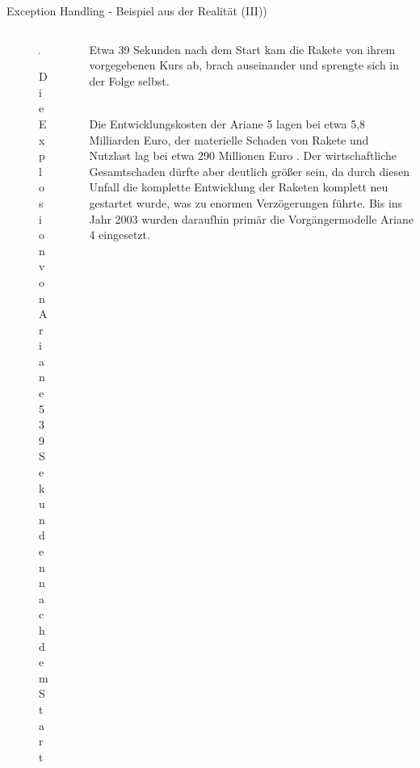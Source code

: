     \begin{frame}[fragile]{Exception Handling - Beispiel aus der Realität (III))}
    
    
    \begin{minipage}{\textwidth}
\begin{columns}[T]
\begin{column}{0.5\textwidth}
\begin{figure}
\includegraphics[keepaspectratio, width=0.9\linewidth]{chapters/10_python4_further_topics/figures/ariane.jpeg}
\caption{Die Explosion von Ariane 5 39 Sekunden nach dem Start}
\cite{ariane_explosion_img}
\end{figure} 
\end{column}
\begin{column}{0.5\textwidth}
Etwa 39 Sekunden nach dem Start kam die Rakete von ihrem vorgegebenen Kurs ab, brach auseinander und sprengte sich in der Folge selbst.\\~\

Die Entwicklungskosten der Ariane 5 lagen bei etwa 5,8 Milliarden Euro, der materielle Schaden von Rakete und Nutzlast lag bei etwa 290 Millionen Euro \cite{arianefailure}. Der wirtschaftliche Gesamtschaden dürfte aber deutlich größer sein, da durch diesen Unfall die komplette Entwicklung der Raketen komplett neu gestartet wurde, was zu enormen Verzögerungen führte. Bis ins Jahr 2003 wurden daraufhin primär die Vorgängermodelle Ariane 4 eingesetzt.

\end{column}
\end{columns}
\end{minipage}



    \end{frame}
    
